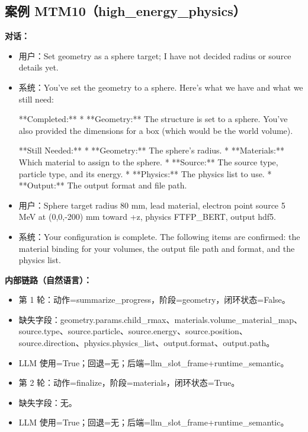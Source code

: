 \documentclass[11pt]{ctexart}
\begin{document}
\subsection{案例 MTM10（high\_energy\_physics）}
\textbf{对话：}
\begin{itemize}
\item 用户：Set geometry as a sphere target; I have not decided radius or source details yet.
\item 系统：You've set the geometry to a sphere. Here's what we have and what we still need:

**Completed:**
*   **Geometry:** The structure is set to a sphere. You've also provided the dimensions for a box (which would be the world volume).

**Still Needed:**
*   **Geometry:** The sphere's radius.
*   **Materials:** Which material to assign to the sphere.
*   **Source:** The source type, particle type, and its energy.
*   **Physics:** The physics list to use.
*   **Output:** The output format and file path.
\item 用户：Sphere target radius 80 mm, lead material, electron point source 5 MeV at (0,0,-200) mm toward +z, physics FTFP\_BERT, output hdf5.
\item 系统：Your configuration is complete. The following items are confirmed: the material binding for your volumes, the output file path and format, and the physics list.
\end{itemize}
\textbf{内部链路（自然语言）：}
\begin{itemize}
\item 第 1 轮：动作=summarize\_progress，阶段=geometry，闭环状态=False。
\item 缺失字段：geometry.params.child\_rmax、materials.volume\_material\_map、source.type、source.particle、source.energy、source.position、source.direction、physics.physics\_list、output.format、output.path。
\item LLM 使用=True；回退=无；后端=llm\_slot\_frame+runtime\_semantic。
\item 第 2 轮：动作=finalize，阶段=materials，闭环状态=True。
\item 缺失字段：无。
\item LLM 使用=True；回退=无；后端=llm\_slot\_frame+runtime\_semantic。
\end{itemize}
\end{document}
